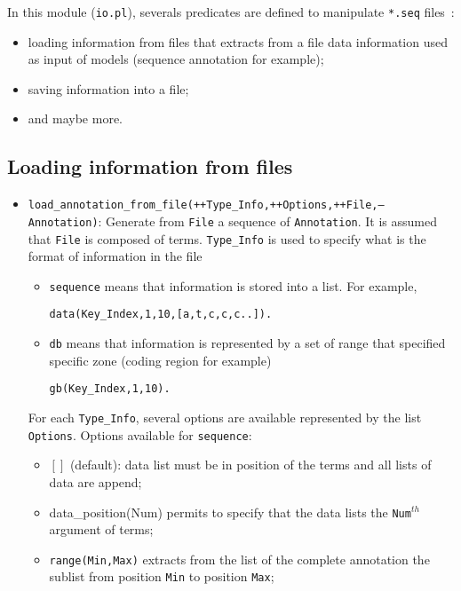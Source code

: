 \documentclass{book}
\begin{document}
In this module (\texttt{io.pl}), severals predicates are defined to
manipulate \texttt{*.seq} files~:
\begin{itemize}
\item loading information from files that extracts from a file data information used as input of models (sequence annotation for example);
\item saving information into a file;
\item and maybe more. 
\end{itemize}

\subsection{Loading information from files}

\begin{itemize}
\item \texttt{load\_annotation\_from\_file(++Type\_Info,++Options,++File,--Annotation)}:
Generate from \texttt{File} a sequence of \texttt{Annotation}. It is assumed that \texttt{File} is composed
of terms. \texttt{Type\_Info} is used to specify what is the format of information in the file
\begin{itemize}
\item \texttt{sequence} means that information is stored into a list. For example, 
\begin{verbatim}
data(Key_Index,1,10,[a,t,c,c,c..]).
\end{verbatim}
\item \texttt{db} means that information is represented by a set of range that specified specific zone (coding region for example)
\begin{verbatim}
gb(Key_Index,1,10).
\end{verbatim}
\end{itemize}
For each \texttt{Type\_Info}, several options are available represented by the list \texttt{Options}. Options available
for \texttt{sequence}:
\begin{itemize}
\item $[]$ (default): data list must be in position of the terms and all lists of data are append;
\item data\_position(Num) permits to specify that the data lists the \texttt{Num}$^{th}$ argument of terms;
\item \texttt{range(Min,Max)} extracts from the list of the complete annotation the sublist from position \texttt{Min} to
position \texttt{Max};

\end{itemize}
\end{itemize}
\end{document}
